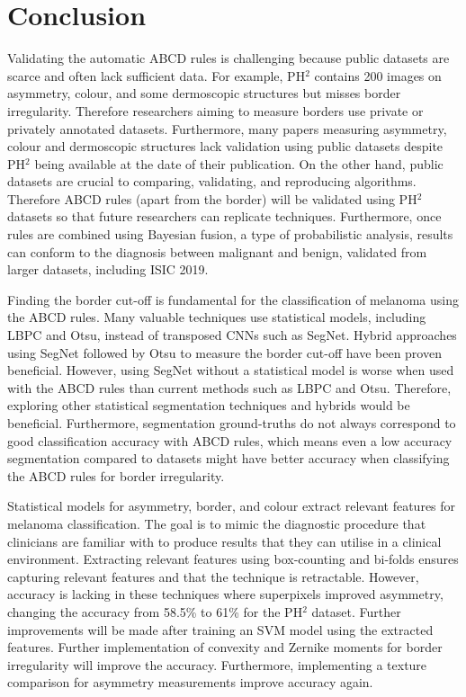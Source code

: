\chapter{Conclusion}

Validating the automatic ABCD rules is challenging because public datasets are scarce and often lack sufficient data. For example, PH$^2$ contains 200 images on asymmetry, colour, and some dermoscopic structures but misses border irregularity. Therefore researchers aiming to measure borders use private or privately annotated datasets. Furthermore, many papers measuring asymmetry, colour and dermoscopic structures lack validation using public datasets despite PH$^2$ being available at the date of their publication. On the other hand, public datasets are crucial to comparing, validating, and reproducing algorithms. Therefore ABCD rules (apart from the border) will be validated using PH$^2$ datasets so that future researchers can replicate techniques. Furthermore, once rules are combined using Bayesian fusion, a type of probabilistic analysis, results can conform to the diagnosis between malignant and benign, validated from larger datasets, including ISIC 2019.

Finding the border cut-off is fundamental for the classification of melanoma using the ABCD rules\cite{Pereira2020}. Many valuable techniques use statistical models, including LBPC and Otsu, instead of transposed CNNs such as SegNet. Hybrid approaches using SegNet followed by Otsu to measure the border cut-off have been proven beneficial. However, using SegNet without a statistical model is worse when used with the ABCD rules than current methods such as LBPC and Otsu. Therefore, exploring other statistical segmentation techniques and hybrids would be beneficial. Furthermore, segmentation ground-truths do not always correspond to good classification accuracy with ABCD rules, which means even a low accuracy segmentation compared to datasets might have better accuracy when classifying the ABCD rules for border irregularity.

Statistical models for asymmetry, border, and colour extract relevant features for melanoma classification. The goal is to mimic the diagnostic procedure that clinicians are familiar with to produce results that they can utilise in a clinical environment. Extracting relevant features using box-counting and bi-folds ensures capturing relevant features and that the technique is retractable. However, accuracy is lacking in these techniques where superpixels improved asymmetry, changing the accuracy from 58.5\% to 61\% for the PH$^2$ dataset. Further improvements will be made after training an SVM model using the extracted features. Further implementation of convexity and Zernike moments for border irregularity will improve the accuracy. Furthermore, implementing a texture comparison for asymmetry measurements improve accuracy again.

